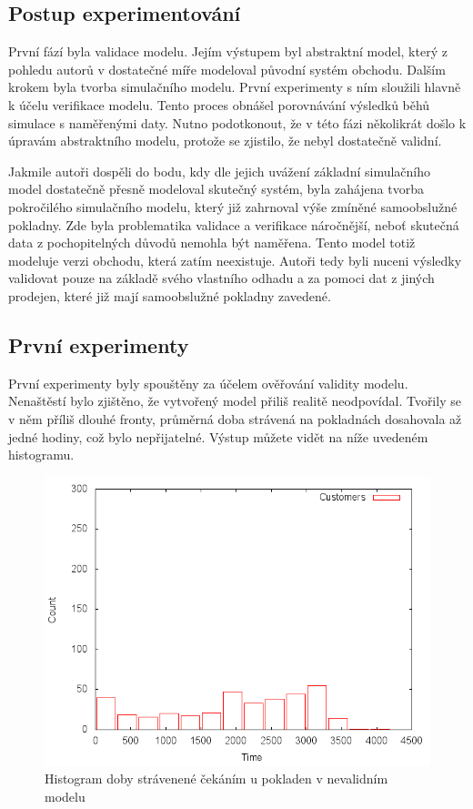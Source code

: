\documentclass[12pt,a4paper,titlepage]{article}
\begin{document}
\subsection{Postup experimentování}
První fází byla validace modelu. Jejím výstupem byl abstraktní model, který z pohledu autorů v dostatečné míře modeloval původní systém obchodu. Dalším krokem byla tvorba simulačního modelu. První experimenty s ním sloužili hlavně k účelu verifikace modelu. Tento proces obnášel porovnávání výsledků běhů simulace s naměřenými daty. Nutno podotkonout, že v této fázi několikrát došlo k úpravám abstraktního modelu, protože se zjistilo, že nebyl dostatečně validní. 

Jakmile autoři dospěli do bodu, kdy dle jejich uvážení základní simulačního model dostatečně přesně modeloval skutečný systém, byla zahájena tvorba pokročilého simulačního modelu, který již zahrnoval výše zmíněné samoobslužné pokladny. Zde byla problematika validace a verifikace náročnější, neboť skutečná data z pochopitelných důvodů nemohla být naměřena. Tento model totiž modeluje verzi obchodu, která zatím neexistuje. Autoři tedy byli nuceni výsledky validovat pouze na základě svého vlastního odhadu a za pomoci dat z jiných prodejen, které již mají samoobslužné pokladny zavedené.

\subsection{První experimenty}
První experimenty byly spouštěny za účelem ověřování validity modelu. Nenaštěstí bylo zjištěno, že vytvořený model přiliš realitě neodpovídal. Tvořily se v něm příliš dlouhé fronty, průměrná doba strávená na pokladnách dosahovala až jedné hodiny, což bylo nepřijatelné. Výstup můžete vidět na níže uvedeném histogramu. 

\begin{figure}[h]
\centering
\includegraphics[scale=0.75]{awful}
\caption{Histogram doby strávenené čekáním u pokladen v nevalidním modelu}
\end{figure}
\end{document}
